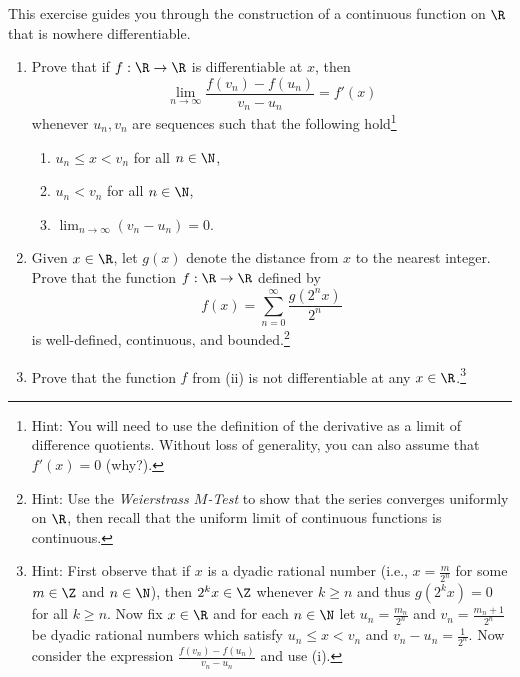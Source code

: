 \documentclass{homework}
\date{Thursday 1/31}
\author{}
\begin{document}
\begin{Exercise}
	This exercise guides you through the construction of a continuous
	function on $\R$ that is nowhere differentiable.
	\begin{enumerate}
  \item Prove that if $f:\R\to\R$ is differentiable at $x$, then
    \begin{equation*}
      \lim_{n\to\infty} \frac{ f(v_n) - f(u_n) }{v_n - u_n} = f'(x)
    \end{equation*}
    whenever $u_n,v_n$ are sequences such that the following
    hold\footnote{Hint: You will need to use the definition of the
      derivative as a limit of difference quotients.  Without loss of
      generality, you can also assume that $f'(x) = 0$ (why?).}
    \smallskip
    \begin{enumerate}
    \item $u_n \leq x < v_n$ for all $n \in \N$,
    \item $u_n <v_n$ for all $n \in \N$,
    \item $\lim_{n\to\infty} (v_n - u_n) = 0$.
    \end{enumerate}

    \begin{solution}
    \end{solution}

  \item Given $x \in \R$, let $g(x)$ denote the distance from $x$ to
    the nearest integer.  Prove that the function $f:\R\to\R$ defined
    by
    \begin{equation*}
      f(x) = \sum_{n=0}^{\infty} \frac{g(2^nx)}{2^n}
    \end{equation*}
    is well-defined, continuous, and bounded.\footnote{Hint: Use the
      \emph{Weierstrass $M$-Test} to show that the series converges
      uniformly on $\R$, then recall that the uniform limit of
      continuous functions is continuous.}

    \begin{solution}
    \end{solution}

  \item Prove that the function $f$ from (ii) is not differentiable at
    any $x \in \R$.\footnote{Hint: First observe that if $x$ is a
      dyadic rational number (i.e., $x = \tfrac{m}{2^n}$ for some
      $m \in \Z$ and $n \in \N$), then $2^k x \in \Z$ whenever
      $k \geq n$ and thus $g(2^kx) = 0$ for all $k \geq n$.  Now fix
      $x \in \R$ and for each $n\in \N$ let $u_n = \frac{m_n}{2^n}$
      and $v_n = \frac{m_n+1}{2^n}$ be dyadic rational numbers which
      satisfy $u_n \leq x < v_n$ and $v_n - u_n = \frac{1}{2^n}$.  Now
      consider the expression $\frac{ f(v_n) - f(u_n) }{v_n -u_n}$ and
      use (i).}

    \begin{solution}
    \end{solution}
	\end{enumerate}
\end{Exercise}
\end{document}
